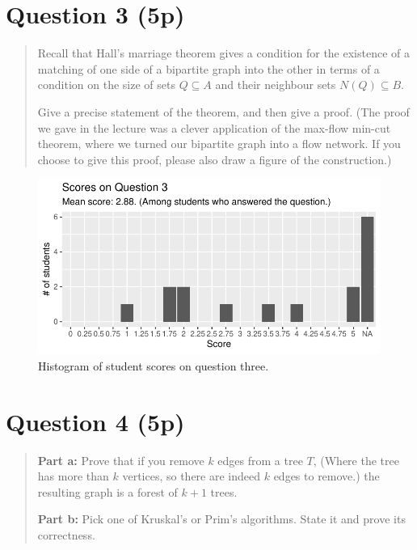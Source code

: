 \documentclass[nobib]{tufte-handout}
\begin{document}
\section{Question 3 (5p)} %

\begin{quotation}
  Recall that Hall's marriage theorem gives a condition for the existence of a matching of one side of a bipartite graph into the other in terms of a condition on the size of sets $Q \subseteq A$ and their neighbour sets $N(Q) \subseteq B$.

  Give a precise statement of the theorem, and then give a proof. (The proof we gave in the lecture was a clever application of the max-flow min-cut theorem, where we turned our bipartite graph into a flow network. If you choose to give this proof, please also draw a figure of the construction.)
\end{quotation}

\begin{figure}
  \centering
  \includegraphics[width = \textwidth]{Q3.pdf}
  \caption[Score histogram for Q3]{Histogram of student scores on question three.}
  \label{fig:Q3}
\end{figure}

\section{Question 4 (5p)} %
\begin{quotation}
  \textbf{Part a:} Prove that if you remove $k$ edges from a tree $T$, (Where the tree has more than $k$ vertices, so there are indeed $k$ edges to remove.) the resulting graph is a forest of $k+1$ trees.
  \vspace{0.5cm}

  \noindent
  \textbf{Part b:} Pick one of Kruskal's or Prim's algorithms. State it and prove its correctness.
\end{quotation}
\end{document}
